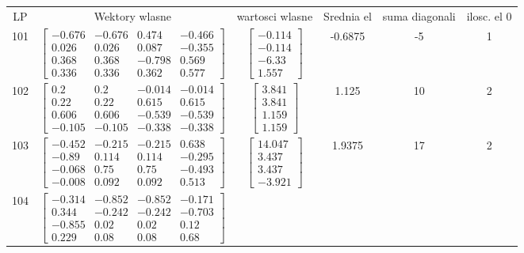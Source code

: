 \documentclass[a4paper,12pt]{article}
\begin{document}
\bgroup {} \vspace{0.2in} \begin{tabular}{c c c c c c}
LP &Wektory wlasne & wartosci wlasne & Srednia el & suma diagonali & ilosc. el 0\\
101
&
$\begin{bmatrix} -0.676 & -0.676 & 0.474 & -0.466 \\ 0.026 & 0.026 & 0.087 & -0.355 \\ 0.368 & 0.368 & -0.798 & 0.569 \\ 0.336 & 0.336 & 0.362 & 0.577 \end{bmatrix}$
&
$\begin{bmatrix} -0.114 \\ -0.114 \\ -6.33 \\ 1.557 \end{bmatrix}$
&
-0.6875
&
-5
&
1
\\
102
&
$\begin{bmatrix} 0.2 & 0.2 & -0.014 & -0.014 \\ 0.22 & 0.22 & 0.615 & 0.615 \\ 0.606 & 0.606 & -0.539 & -0.539 \\ -0.105 & -0.105 & -0.338 & -0.338 \end{bmatrix}$
&
$\begin{bmatrix} 3.841 \\ 3.841 \\ 1.159 \\ 1.159 \end{bmatrix}$
&
1.125
&
10
&
2
\\
103
&
$\begin{bmatrix} -0.452 & -0.215 & -0.215 & 0.638 \\ -0.89 & 0.114 & 0.114 & -0.295 \\ -0.068 & 0.75 & 0.75 & -0.493 \\ -0.008 & 0.092 & 0.092 & 0.513 \end{bmatrix}$
&
$\begin{bmatrix} 14.047 \\ 3.437 \\ 3.437 \\ -3.921 \end{bmatrix}$
&
1.9375
&
17
&
2
\\
104
&
$\begin{bmatrix} -0.314 & -0.852 & -0.852 & -0.171 \\ 0.344 & -0.242 & -0.242 & -0.703 \\ -0.855 & 0.02 & 0.02 & 0.12 \\ 0.229 & 0.08 & 0.08 & 0.68 \end{bmatrix}$

\end{tabular}
\end{document}
